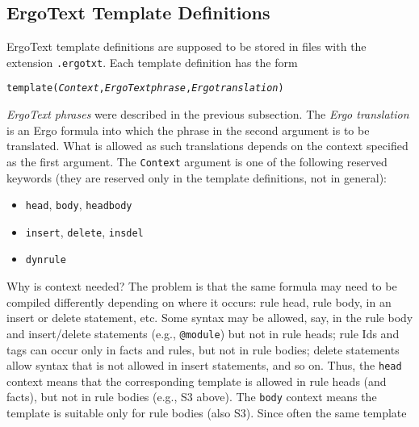 \subsection{ErgoText Template Definitions}

ErgoText template definitions are supposed to be stored in files with the
extension \texttt{.ergotxt}. Each template definition has the form 
\begin{alltt}
    template(\textnormal{\textit{Context}, \textit{ErgoText phrase}, \textit{Ergo translation}})
\end{alltt}
\emph{ErgoText phrases}
were described in the previous subsection. The \emph{Ergo
translation}   is an Ergo formula into which the phrase in the second
argument is to be
translated. What is allowed as such translations depends on the context
specified as the first argument.
The \texttt{Context} argument is one of the following reserved keywords (they are
reserved
only in the template definitions, not in general):
\begin{itemize}
\item  \texttt{head},  \texttt{body},  \texttt{headbody} 
\item  \texttt{insert},  \texttt{delete},  \texttt{insdel} 
\item  \texttt{dynrule}  
\end{itemize}
Why is context needed? The problem is that the same \ERGO formula may
need to be compiled differently depending on where it occurs: rule head,
rule body, in an insert or delete statement, etc. Some syntax may be allowed, say,
in the rule body and insert/delete statements (e.g., \texttt{@module}) but
not in rule heads; rule Ids and tags can occur only in facts and rules, but
not in rule bodies; delete statements allow syntax that is not allowed in
insert statements, and so on.  Thus, the \texttt{head} context means that
the corresponding template is allowed in rule heads (and facts), but not in
rule bodies (e.g., S3 above). The \texttt{body} context means the template
is suitable only for rule bodies (also S3).  Since often the same template
